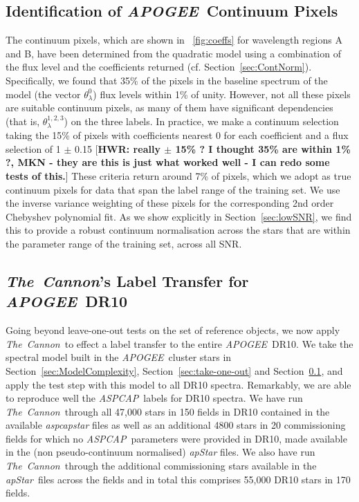 \documentclass[12pt, preprint]{aastex}
\newcommand{\sectionname}{Section}
\newcommand{\tc}{\textsl{The~Cannon}}
\newcommand{\apogee}{\textsl{APOGEE}}
\newcommand{\aspcap}{\textsl{ASPCAP}}
\newcommand{\apstar}{\textsl{apStar}}
\begin{document}
\subsection{Identification of \apogee\ Continuum Pixels}
\label{sec:ApogeeContinuum}

The continuum pixels, which are shown in \figurename~\ref{fig:coeffs} for wavelength regions A and B, 
have been determined from the quadratic model using a combination of the flux level and the coefficients returned
(cf. \sectionname~\ref{sec:ContNorm}). Specifically, we found that 35\% of the pixels in the baseline spectrum of the model (the vector $\theta^0_\lambda$) flux levels within 1\% of unity. However, not all these pixels are suitable continuum pixels, as many of them have significant dependencies (that is, $\theta^{1,2,3}_\lambda$)
on the three labels. 
In practice, we make a continuum selection taking the 15\% of pixels with coefficients nearest 0 for each coefficient and a flux selection of 1 $\pm$ 0.15 [{\bf HWR: really $\pm$ 15\% ? I thought 35\% are within 1\% ?, MKN - they are this is just what worked well - I can redo some tests of this.}]
These criteria return around 7\% of pixels, which we adopt as true continuum pixels for data that span the label range of the training set. We use the inverse variance weighting of these pixels for the corresponding 2nd order Chebyshev polynomial fit. 
As we show explicitly in \sectionname~\ref{sec:lowSNR}, we find this to provide a robust continuum normalisation across the stars that are within the parameter range of the training set, 
across all SNR. 

\subsection{\tc 's Label Transfer for \apogee\ DR10}
\label{sec:APOGEE_DR10_comparison}

Going beyond leave-one-out tests on the set of reference objects, we now apply \tc\ to effect a label transfer to the entire \apogee\ DR10.
We take the spectral model built in the \apogee\ cluster stars in \sectionname~\ref{sec:ModelComplexity}, \sectionname~\ref{sec:take-one-out} and \sectionname~\ref{sec:ApogeeContinuum},
and apply the test step with this model to all DR10 spectra.
Remarkably, we are able to reproduce well the \aspcap\ labels for DR10 spectra. We have run \tc\ through all 47,000 stars in 150 fields in DR10 contained in the available \textit{aspcapstar} files as well as an additional 4800 stars in 20 commissioning fields for which no \aspcap\ parameters were provided in DR10, 
made available in the (non pseudo-continuum normalised) \textit{apStar} files. 
We also have run \tc\ through the additional commissioning stars available in the \apstar\ files across the fields and in total this
 comprises 55,000 DR10 stars in 170 fields. %
\end{document}
